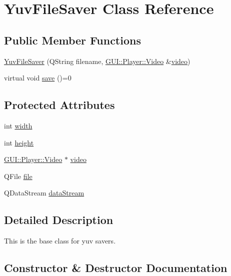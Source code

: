 \hypertarget{classUtility_1_1YuvFileSaver}{}\section{Yuv\+File\+Saver Class Reference}
\label{classUtility_1_1YuvFileSaver}
\subsection*{Public Member Functions}
\begin{DoxyCompactItemize}
\item 
\hyperlink{classUtility_1_1YuvFileSaver_ac26737451152f17475d0409ccd7698a1}{Yuv\+File\+Saver} (Q\+String filename, \hyperlink{classGUI_1_1Player_1_1Video}{G\+U\+I\+::\+Player\+::\+Video} \&\hyperlink{classUtility_1_1YuvFileSaver_ac39cb6d0a56308ca6323374fc0d74c96}{video})
\item 
virtual void \hyperlink{classUtility_1_1YuvFileSaver_a710cb29afe2cd3d97a312f61140af200}{save} ()=0
\end{DoxyCompactItemize}
\subsection*{Protected Attributes}
\begin{DoxyCompactItemize}
\item 
int \hyperlink{classUtility_1_1YuvFileSaver_a2474a5474cbff19523a51eb1de01cda4}{width}
\item 
int \hyperlink{classUtility_1_1YuvFileSaver_ad12fc34ce789bce6c8a05d8a17138534}{height}
\item 
\hyperlink{classGUI_1_1Player_1_1Video}{G\+U\+I\+::\+Player\+::\+Video} $\ast$ \hyperlink{classUtility_1_1YuvFileSaver_ac39cb6d0a56308ca6323374fc0d74c96}{video}
\item 
Q\+File \hyperlink{classUtility_1_1YuvFileSaver_a74a949f8555712ca2e528cf69d0d7f68}{file}
\item 
Q\+Data\+Stream \hyperlink{classUtility_1_1YuvFileSaver_a76868f3c583ad31447f724a6dcce0a8a}{data\+Stream}
\end{DoxyCompactItemize}


\subsection{Detailed Description}
This is the base class for yuv savers. 

\subsection{Constructor \& Destructor Documentation}
\hypertarget{classUtility_1_1YuvFileSaver_ac26737451152f17475d0409ccd7698a1}{}
